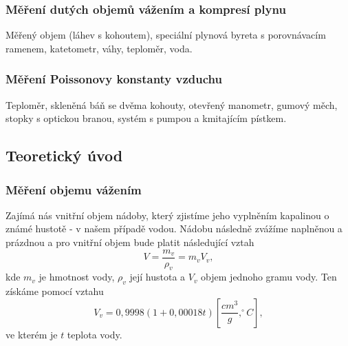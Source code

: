 \documentclass[english]{article}
\begin{document}
		\subsubsection{Měření dutých objemů vážením a kompresí plynu}
			Měřený objem (láhev s kohoutem), speciální plynová byreta s porovnávacím ramenem, katetometr, váhy, teploměr, voda.
		
		\subsubsection{Měření Poissonovy konstanty vzduchu}
			Teploměr, skleněná báň se dvěma kohouty, otevřený manometr, gumový měch, stopky s optickou branou, systém s pumpou a kmitajícím pístkem.
						
	\subsection{Teoretický úvod}
			
			\subsubsection{Měření objemu vážením}
					Zajímá nás vnitřní objem nádoby, který zjistíme jeho vyplněním kapalinou o známé hustotě - v našem případě vodou. Nádobu následně zvážíme naplněnou a prázdnou a pro vnitřní objem bude platit následující vztah
					\begin{equation}\label{eq:objem_vazeni}
						V = \frac{m_v}{\rho_v}=m_v V_v,
					\end{equation}
					kde $m_v$ je hmotnost vody, $\rho_v$ její hustota a $V_v$ objem jednoho gramu vody. Ten získáme pomocí vztahu 
					\begin{equation}\label{eq:objem_V_v}
						V_v = 0,9998(1+0,00018t) \left[\frac{cm^3}{g},^\circ C\right],
					\end{equation}
					ve kterém je $t$ teplota vody.
				
\end{document}
